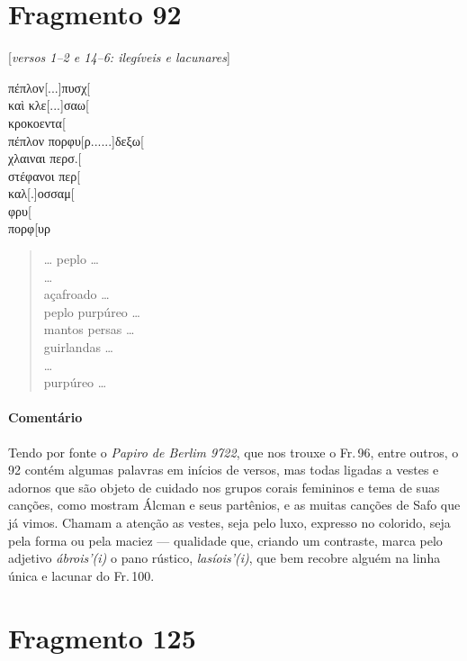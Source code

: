 \section{Fragmento 92} 

\begin{gkverse}
\textnormal{[\emph{versos 1--2 e 14--6: ilegíveis e lacunares}]}

πέπλον[...]πυσχ[\\
καὶ κλε[...]σαω[\\
κροκοεντα[\\
πέπλον πορφυ[ρ......]δεξω[\\
χλαιναι περσ.[\\
στέφανοι περ[\\
καλ[.]οσσαμ[\\
φρυ[\\
πορφ[υρ
\end{gkverse}

\begin{verse}
\ldots{} peplo \ldots{}\\ 
\ldots{}\\
açafroado \ldots{}\\
peplo purpúreo \ldots{}\\
mantos persas \ldots{}\\
guirlandas \ldots{}\\
\ldots{}\\
purpúreo \ldots{}
\end{verse}

\medskip

{\paragraph{Comentário} Tendo por fonte o \emph{Papiro de Berlim 9722}, que nos trouxe o Fr.\,96, entre outros, o 92 contém algumas palavras em inícios de versos, mas todas ligadas a vestes e adornos que são objeto de cuidado nos grupos corais femininos e tema de suas canções, como mostram Álcman e seus partênios, e as muitas canções de Safo que já vimos. Chamam a atenção as vestes, seja pelo luxo, expresso no colorido, seja pela forma ou pela maciez --- qualidade que, criando um contraste, marca pelo adjetivo \emph{ábrois'(i)} o pano rústico, \emph{lasíois'(i)}, que bem recobre alguém na linha única e lacunar do Fr.\,100.}



\section{Fragmento 125}

